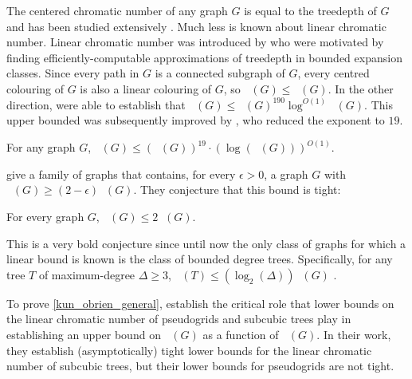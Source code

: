 \documentclass{patmorin}
\DeclareMathOperator{\chicen}{\chi_{\mathrm{cen}}}
\DeclareMathOperator{\chilin}{\chi_{\mathrm{lin}}}
\begin{document}
The centered chromatic number of any graph $G$ is equal to the treedepth of $G$ and has been studied extensively \cite{nesetril.ossona:sparsity,nesetril.ossona:on,nesetril.ossona:grad,nesetril.ossona:tree-depth,pilipczuk.siebertz:polynomial,dereniowski.nadolski:vertex,dereniowski.kubale:cholesky,deogun.kloks.ea:on,bodlaender.gilbert.ea:approximating,bodlaender.deogun.ea:rankings}. Much less is known about linear chromatic number.  Linear chromatic number was introduced by \citet{kun.obrien.ea:polynomial} who were motivated by finding efficiently-computable approximations of treedepth in bounded expansion classes.  Since every path in $G$ is a connected subgraph of $G$, every centred colouring of $G$ is also a linear colouring of $G$, so $\chilin(G)\le\chicen(G)$. In the other direction, \citet{kun.obrien.ea:polynomial} were able to establish that $\chicen(G)\le \chilin(G)^{190}\log^{O(1)}\chilin(G)$.  This upper bounded was subsequently improved by \citet{czerwinski.nadara.ea:improved}, who reduced the exponent to $19$.

\begin{thm}\label{kun_obrien_general}
  For any graph $G$, $\chicen(G)\le (\chilin(G))^{19}\cdot(\log(\chilin(G)))^{O(1)}$.
\end{thm}

\citet{kun.obrien.ea:polynomial} give a family of graphs that contains, for every $\epsilon > 0$, a graph $G$ with $\chicen(G)\ge (2-\epsilon)\chilin(G)$. They conjecture that this bound is tight:

\begin{conj}\label{crazy_conjecture}
  For every graph $G$, $\chicen(G)\le 2\chilin(G)$.
\end{conj}

This is a very bold conjecture since until now the only class of graphs for which a linear bound is known is the class of bounded degree trees. Specifically, for any tree $T$ of maximum-degree $\Delta\ge 3$, $\chicen(T) \le (\log_2(\Delta))\chilin(G)$ \cite[Theorem~4]{kun.obrien.ea:polynomial}.

To prove \cref{kun_obrien_general}, \citet{kun.obrien.ea:polynomial} establish the critical role that lower bounds on the linear chromatic number of pseudogrids and subcubic trees play in establishing an upper bound on $\chicen(G)$ as a function of $\chilin(G)$. In their work, they establish (asymptotically) tight lower bounds for the linear chromatic number of subcubic trees, but their lower bounds for pseudogrids are not tight.
\end{document}

